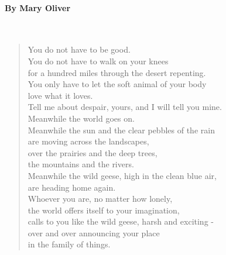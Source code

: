 \documentclass[12pt, openany, letterpaper]{memoir}
\begin{document}
\paragraph{By Mary Oliver}~
\begin{verse}
	You do not have to be good.\\
	You do not have to walk on your knees\\
	for a hundred miles through the desert repenting.\\
	You only have to let the soft animal of your body\\
	love what it loves.\\
	Tell me about despair, yours, and I will tell you mine.\\
	Meanwhile the world goes on.\\
	Meanwhile the sun and the clear pebbles of the rain\\
	are moving across the landscapes,\\
	over the prairies and the deep trees,\\
	the mountains and the rivers.\\
	Meanwhile the wild geese, high in the clean blue air,\\
	are heading home again.\\
	Whoever you are, no matter how lonely,\\
	the world offers itself to your imagination,\\
	calls to you like the wild geese, harsh and exciting -\\
	over and over announcing your place\\
	in the family of things.
\end{verse}
\end{document}
